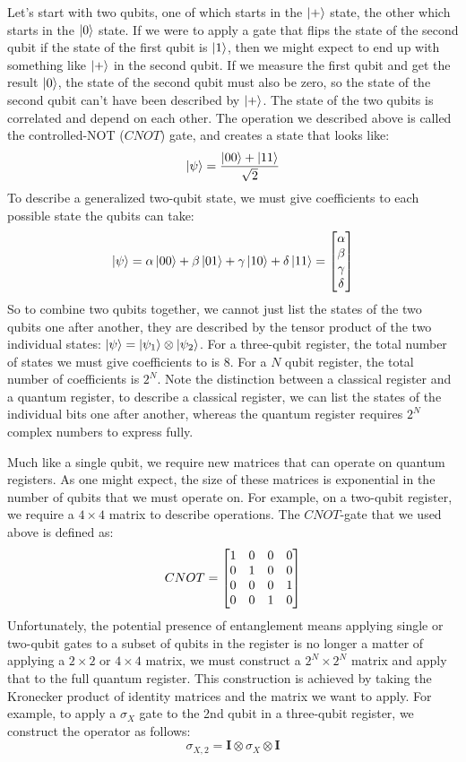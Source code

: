 Let's start with two qubits, one of which starts in the $\ket{+}$ state, the other which starts in
the $\ket{0}$ state. If we were to apply a gate that flips the state of the second qubit if the state of
the first qubit is $\ket{1}$, then we might expect to end up with something like $\ket{+}$ in the second
qubit. If we measure the first qubit and get the result $\ket{0}$, the state of the second qubit must also
be zero, so the state of the second qubit can't have been described by $\ket{+}$. The state of the two
qubits is correlated and depend on each other. The operation we described above is called the 
controlled-NOT ($CNOT$) gate, and creates a state that looks like:
\begin{equation}
  \ket{\psi} = \frac{\ket{00} + \ket{11}}{\sqrt{2}}
\end{equation}
To describe a generalized two-qubit state, we must give coefficients to each possible state the qubits
can take:
\begin{equation}
  \ket{\psi} = \alpha\ket{00} + \beta\ket{01} + \gamma\ket{10} + \delta\ket{11} = 
    \begin{bmatrix}\alpha\\\beta\\\gamma\\\delta\end{bmatrix}
\end{equation}
So to combine two qubits together, we cannot just list the states of the two qubits one after another,
they are described by the tensor product of the two individual states: $\ket{\psi} = \ket{\psi_1}\otimes\ket{\psi_2}$.
For a three-qubit register, the total number of states we must give coefficients to is 8. For a $N$ qubit
register, the total number of coefficients is $2^N$. Note the distinction between a classical register
and a quantum register, to describe a classical register, we can list the states of the individual
bits one after another, whereas the quantum register requires $2^N$ complex numbers to express fully.

Much like a single qubit, we require new matrices that can operate on quantum registers. As one 
might expect, the size of these matrices is exponential in the number of qubits that we must operate on.
For example, on a two-qubit register, we require a $4 \times 4$ matrix to describe operations. The 
$CNOT$-gate that we used above is defined as:
\begin{equation}
  CNOT = \begin{bmatrix}1&0&0&0\\0&1&0&0\\0&0&0&1\\0&0&1&0\end{bmatrix}
\end{equation}
Unfortunately, the potential presence of entanglement means applying single or two-qubit gates to a subset
of qubits in the register is no longer a matter of applying a $2 \times 2$ or $4 \times 4$ matrix, we must
construct a $2^N \times 2^N$ matrix and apply that to the full quantum register. This construction is achieved
by taking the Kronecker product of identity matrices and the matrix we want to apply. For example, to apply
a $\sigma_X$ gate to the 2nd qubit in a three-qubit register, we construct the operator as follows:
\begin{equation}
  \sigma_{X,2} = \boldsymbol{I} \otimes \sigma_X \otimes \boldsymbol{I}
\end{equation}

